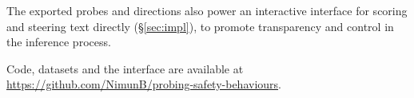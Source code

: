 The exported probes and directions also power an interactive interface for
scoring and steering text directly (\S\ref{sec:impl}), to promote transparency and 
control in the inference process.

Code, datasets and
the interface are available at
\url{https://github.com/NimunB/probing-safety-behaviours}.
